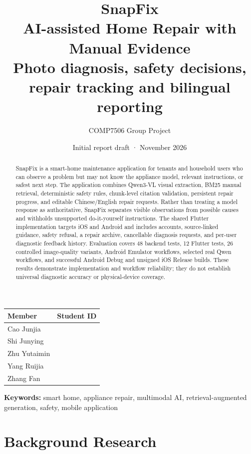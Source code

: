 \documentclass[10.5pt,a4paper]{article}
\title{
  \vspace{-12mm}
  {\color{SnapPurple}\Huge\bfseries SnapFix}\\[4mm]
  {\Large\bfseries AI-assisted Home Repair with Manual Evidence}\\[3mm]
  {\large\color{SnapMuted}Photo diagnosis, safety decisions, repair tracking and bilingual reporting}
}
\author{COMP7506 Group Project}
\date{Initial report draft · November 2026}
\begin{document}
\maketitle
\thispagestyle{empty}

\begin{center}
\begin{tabular}{ll}
\toprule
\textbf{Member} & \textbf{Student ID} \\
\midrule
Cao Junjia & \\
Shi Junying & \\
Zhu Yutaimin & \\
Yang Ruijia & \\
Zhang Fan & \\
\bottomrule
\end{tabular}
\end{center}

\vspace{3mm}
\begin{abstract}
SnapFix is a smart-home maintenance application for tenants and household users who can observe a problem but may not know the appliance model, relevant instructions, or safest next step. The application combines Qwen3-VL visual extraction, BM25 manual retrieval, deterministic safety rules, chunk-level citation validation, persistent repair progress, and editable Chinese/English repair requests. Rather than treating a model response as authoritative, SnapFix separates visible observations from possible causes and withholds unsupported do-it-yourself instructions. The shared Flutter implementation targets iOS and Android and includes accounts, source-linked guidance, safety refusal, a repair archive, cancellable diagnosis requests, and per-user diagnostic feedback history. Evaluation covers 48 backend tests, 12 Flutter tests, 26 controlled image-quality variants, Android Emulator workflows, selected real Qwen workflows, and successful Android Debug and unsigned iOS Release builds. These results demonstrate implementation and workflow reliability; they do not establish universal diagnostic accuracy or physical-device coverage.
\end{abstract}

\vspace{2mm}
{\small\textbf{Keywords:} smart home, appliance repair, multimodal AI, retrieval-augmented generation, safety, mobile application}

\newpage
\section{Background Research}
\end{document}
